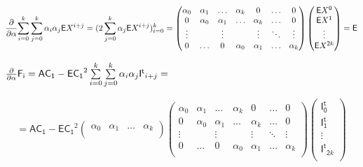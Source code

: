 \documentclass[a4paper,12pt]{article}
\begin{document}
\begin{displaymath}
    {\partial\over{\partial \alpha}} {\sum\limits_{i = 0}^k}\sum\limits_{j=0}^k\alpha_i \alpha_j \mathsf{E}X^{i + j} = (2\sum\limits_{j = 0}^k \alpha_j \mathsf{E}X^{i + j})_{i = 0}^k
    = \begin{pmatrix}
        \alpha_0 & \alpha_1 & \ldots & \alpha_k & 0 & \ldots & 0 \\
        0 & \alpha_0 & \alpha_1 & \ldots & \alpha_k & \ldots & 0 \\
        \vdots &  & \vdots &  & \vdots & \ddots & \vdots\\
        0 & \ldots & 0 & \alpha_0 & \alpha_1 &\ldots & \alpha_k \\
    \end{pmatrix} \begin{pmatrix}
        \mathsf{E}X^{\mathsf{0}} \\ \mathsf{E}X^\mathsf{1} \\ \vdots \\ \mathsf{E}X^{\mathsf{2}k} \\
    \end{pmatrix} = \mathsf{E}
\end{displaymath}

\begin{center}
    ${\partial\over{\partial \alpha}} \mathsf{F_i} = {\mathsf{A}\mathsf{C_1}} - {\mathsf{E}\mathsf{C_1}^2 \sum\limits_{i = 0}^k \sum\limits_{j = 0}^k \alpha_i \alpha_j \mathsf{I^{t}}_{i + j}} =$
\end{center}

\begin{displaymath}
    = {\mathsf{A}\mathsf{C_1}} - {\mathsf{E}\mathsf{C_1}^2} \begin{pmatrix}
        \alpha_0 & \alpha_1 & \ldots & \alpha_k \\
    \end{pmatrix} \begin{pmatrix}
        \alpha_0 & \alpha_1 & \ldots & \alpha_k & 0 & \ldots & 0 \\
        0 & \alpha_0 & \alpha_1 & \ldots & \alpha_k & \ldots & 0 \\
        \vdots &  & \vdots &  & \vdots & \ddots & \vdots\\
        0 & \ldots & 0 & \alpha_0 & \alpha_1 &\ldots & \alpha_k \\
    \end{pmatrix} \begin{pmatrix}
        \mathsf{I^t_0} \\ \mathsf{I^t_1} \\ \vdots \\ \mathsf{I^t}_{\mathsf{2}k} \\
    \end{pmatrix}
\end{displaymath}\\
\end{document}
